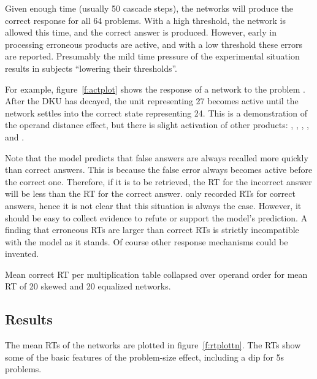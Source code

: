 Given enough time (usually 50 cascade steps), the networks will produce the
correct response for all 64 problems.  With a high threshold, the network
is allowed this time, and the correct answer is produced.  However, early
in processing erroneous products are active, and with a low threshold these
errors are reported. Presumably the mild time pressure of the experimental
situation results in subjects ``lowering their thresholds''.

For example, figure~\ref{f:actplot} shows the response of a network to the
problem . After the DKU has decayed, the unit representing 27 becomes
active until the network settles into the correct state representing 24.
This is a
demonstration of the operand distance effect, but there is slight
activation of other products: , ,
, , and .

Note that the model predicts that false answers are always recalled more
quickly than correct answers. This is because the false error always
becomes active before the correct one.  Therefore, if it is to be
retrieved, the RT for the incorrect answer will be less than the RT for the
correct answer.  only recorded RTs for correct answers, hence
it is not clear that this situation is always the case.  However, it should
be easy to collect evidence to refute or support the model's prediction.
A finding that erroneous RTs are larger than correct RTs is strictly
incompatible with the model as it stands.  Of course other response
mechanisms could be invented.


\begin{fancyfigure}
\centerline{%
}
\caption{Mean correct RT per multiplication table collapsed over
operand order for mean RT of 20 skewed and 20 equalized networks.}
\label{f:rtplottn}
\end{fancyfigure}

\subsection{Results}

The mean RTs of the networks are plotted in figure~\ref{f:rtplottn}. The
RTs show some of the basic features of the problem-size effect, including a
dip for 5s problems.

